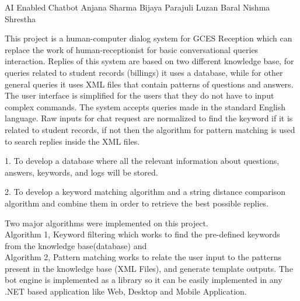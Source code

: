  \begin{conf-abstract}[]
 {AI Enabled Chatbot }
 {Anjana Sharma
 	Bijaya Parajuli
 	Luzan Baral
 	Nishma Shrestha
 }
{}

This project is a human-computer dialog system for GCES Reception which can replace the work of human-receptionist for basic conversational queries interaction. Replies of this system are based on two different knowledge base, for queries related to student records (billings) it uses a database, while for other general queries it uses XML files that contain patterns of questions and answers. The user interface is simplified for the users that they do not have to input complex commands. The system accepts queries made in the standard English language. Raw inputs for chat request are normalized to find the keyword if it is related to student records, if not then the algorithm for pattern matching is used to search replies inside the XML files.

1.    To develop a database where all the relevant information about questions, answers, keywords, and logs will be stored.

2.    To develop a keyword matching algorithm and a string distance comparison algorithm and combine them in order to retrieve the best possible replies.

Two major algorithms were implemented on this project.
\\
 Algorithm 1, Keyword filtering which works to find the pre-defined keywords from the knowledge base(database) and 
 \\
 Algorithm 2, Pattern matching works to relate the user input to the patterns present in the knowledge base (XML Files), and generate template outputs. The bot engine is implemented as a library so it can be easily implemented in any .NET based application like Web, Desktop and Mobile Application.

 \end{conf-abstract}
